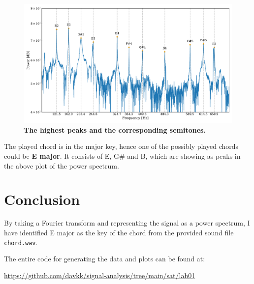 \documentclass[13pt,a4paper]{article}
\begin{document}
\begin{figure}[ht!]
    \centering
    \caption{\textbf{The highest peaks and the corresponding semitones.}}
    \includegraphics[width=1\textwidth]{peaks.pdf}
\end{figure}

The played chord is in the major key, hence one of the possibly played chords could be \textbf{E major}. It consists of E, G\# and B, which are showing as peaks in the above plot of the power spectrum.


\section{Conclusion}

By taking a Fourier transform and representing the signal as a power spectrum, I have identified E major as the key of the chord from the provided sound file \verb|chord.wav|.

The entire code for generating the data and plots can be found at:

\url{https://github.com/davkk/signal-analysis/tree/main/sat/lab01}
\end{document}

